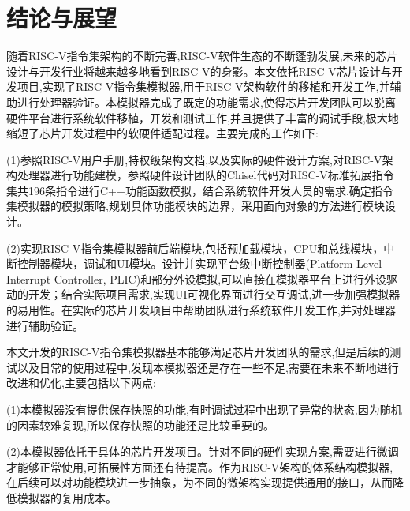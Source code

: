 
\chapter{结论与展望}
随着RISC-V指令集架构的不断完善,RISC-V软件生态的不断蓬勃发展,未来的芯片设计与开发行业将越来越多地看到RISC-V的身影。本文依托RISC-V芯片设计与开发项目,实现了RISC-V指令集模拟器,用于RISC-V架构软件的移植和开发工作,并辅助进行处理器验证。本模拟器完成了既定的功能需求,使得芯片开发团队可以脱离硬件平台进行系统软件移植，开发和测试工作,并且提供了丰富的调试手段,极大地缩短了芯片开发过程中的软硬件适配过程。主要完成的工作如下:


(1)参照RISC-V用户手册,特权级架构文档,以及实际的硬件设计方案,对RISC-V架构处理器进行功能建模，参照硬件设计团队的Chisel代码对RISC-V标准拓展指令集共196条指令进行C++功能函数模拟，结合系统软件开发人员的需求,确定指令集模拟器的模拟策略,规划具体功能模块的边界，采用面向对象的方法进行模块设计。


(2)实现RISC-V指令集模拟器前后端模块,包括预加载模块，CPU和总线模块，中断控制器模块，调试和UI模块。设计并实现平台级中断控制器(Platform-Level Interrupt Controller, PLIC)和部分外设模拟,可以直接在模拟器平台上进行外设驱动的开发；结合实际项目需求,实现UI可视化界面进行交互调试,进一步加强模拟器的易用性。在实际的芯片开发项目中帮助团队进行系统软件开发工作,并对处理器进行辅助验证。


本文开发的RISC-V指令集模拟器基本能够满足芯片开发团队的需求,但是后续的测试以及日常的使用过程中,发现本模拟器还是存在一些不足,需要在未来不断地进行改进和优化,主要包括以下两点:


(1)本模拟器没有提供保存快照的功能,有时调试过程中出现了异常的状态,因为随机的因素较难复现,所以保存快照的功能还是比较重要的。


(2)本模拟器依托于具体的芯片开发项目。针对不同的硬件实现方案,需要进行微调才能够正常使用,可拓展性方面还有待提高。作为RISC-V架构的体系结构模拟器,在后续可以对功能模块进一步抽象，为不同的微架构实现提供通用的接口，从而降低模拟器的复用成本。

